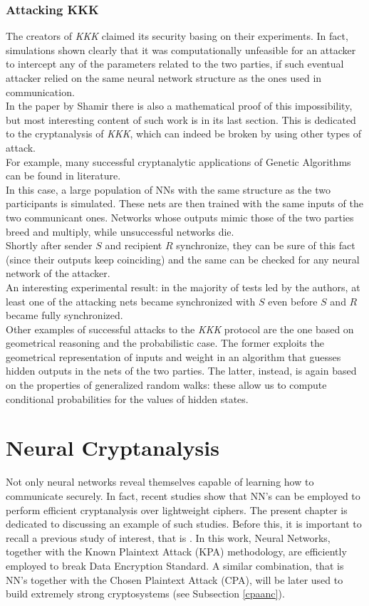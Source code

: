 \documentclass[%
    corpo=11pt,
    twoside,
    stile=classica,
    oldstyle,
    autoretitolo,
    tipotesi=magistrale,
    greek,
    evenboxes,
    english
]{toptesi}
\begin{document}
\subsection{Attacking KKK}
\label{ssc:atk}
The creators of \textit{KKK} claimed its security basing on their experiments. In fact, simulations shown clearly that it was computationally unfeasible for an attacker to intercept any of the parameters related to the two parties, if such eventual attacker relied on the same neural network structure as the ones used in communication. \\
In the paper by Shamir there is also a mathematical proof of this impossibility, but most interesting content of such work is in its last section. This is dedicated to the cryptanalysis of \textit{KKK}, which can indeed be broken by using other types of attack. \\
For example, many successful cryptanalytic applications of Genetic Algorithms can be found in literature. \\
In this case, a large population of NNs with the same structure as the two participants is simulated. These nets are then trained with the same inputs of the two communicant ones. Networks whose outputs mimic those of the two parties breed and multiply, while unsuccessful networks die. \\
Shortly after sender $S$ and recipient $R$ synchronize, they can be sure of this fact (since their outputs keep coinciding) and the same can be checked for any neural network of the attacker. \\
An interesting experimental result: in the majority of tests led by the authors, at least one  of the attacking nets became synchronized with $S$ even before $S$ and $R$ became fully synchronized. \\
Other examples of successful attacks to the \textit{KKK} protocol are the one based on geometrical reasoning and the probabilistic case. The former exploits the geometrical representation of inputs and weight in an algorithm that guesses hidden outputs in the nets of the two parties. The latter, instead, is again based on the properties of generalized random walks: these allow us to compute conditional probabilities for the values of hidden states.

\chapter{Neural Cryptanalysis}
Not only neural networks reveal themselves capable of learning how to communicate securely. In fact, recent studies show that NN's can be employed to perform efficient cryptanalysis over lightweight ciphers. The present chapter is dedicated to discussing an example of such studies. Before this, it is important to recall a previous study of interest, that is \cite{alani}. In this work, Neural Networks, together with the Known Plaintext Attack (KPA) methodology, are efficiently employed to break Data Encryption Standard. A similar combination, that is NN's together with the Chosen Plaintext Attack (CPA), will be later used to build extremely strong cryptosystems (see Subsection \ref{cpaanc}). 
\end{document}
